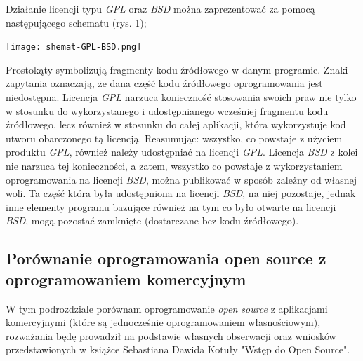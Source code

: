 \documentclass{article}
\begin{document}
Działanie licencji typu \emph{GPL} oraz \emph{BSD} można zaprezentować za pomocą następującego schematu (rys. 1);
\begin{center}
        \texttt{[image: shemat-GPL-BSD.png]}
\end{center}
Prostokąty symbolizują fragmenty kodu źródłowego w danym programie. Znaki zapytania oznaczają, że dana część kodu źródłowego oprogramowania jest niedostępna. Licencja \emph{GPL} narzuca konieczność stosowania swoich praw nie tylko w stosunku do wykorzystanego i udostępnianego wcześniej fragmentu kodu źródłowego, lecz również w stosunku do całej aplikacji, która wykorzystuje kod utworu obarczonego tą licencją.
Reasumując: wszystko, co powstaje z użyciem produktu \emph{GPL}, również należy udostępniać na licencji \emph{GPL}. Licencja \emph{BSD} z kolei nie narzuca tej konieczności, a zatem, wszystko co powstaje z wykorzystaniem oprogramowania na licencji \emph{BSD}, można publikować w sposób zależny od własnej woli.
Ta część która była udostępniona na licencji \emph{BSD}, na niej pozostaje, jednak inne elementy programu bazujące również na tym co było otwarte na licencji \emph{BSD}, mogą pozostać zamknięte (dostarczane bez kodu źródłowego)\cite{Kotula}.

\subsection{Porównanie oprogramowania open source z oprogramowaniem komercyjnym}

W tym podrozdziale porównam oprogramowanie \emph{open source} z aplikacjami komercyjnymi (które są jednocześnie oprogramowaniem własnościowym), rozważania będę prowadził na podstawie własnych obserwacji oraz wniosków przedstawionych w książce Sebastiana Dawida Kotuły "Wstęp do Open Source"\cite{Kotula}.
\end{document}
